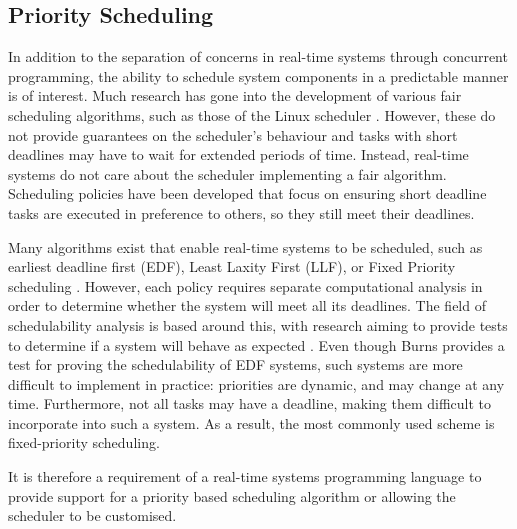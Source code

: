 \subsection{Priority Scheduling}
In addition to the separation of concerns in real-time systems through
concurrent programming, the ability to schedule system components in a
predictable manner is of interest.  Much research has gone into the development
of various fair scheduling algorithms, such as those of the Linux
scheduler \cite{6043273,7280991}. However, these do not provide guarantees on
the scheduler's behaviour and tasks with short deadlines may have to wait for
extended periods of time. Instead, real-time systems do not care about the
scheduler implementing a fair algorithm. Scheduling policies have been
developed that focus on ensuring short deadline tasks are executed in
preference to others, so they still meet their deadlines. 
\par\bigskip\noindent
Many algorithms exist that enable real-time systems to be
scheduled, such as earliest deadline first (EDF), Least Laxity First (LLF), or
Fixed Priority scheduling \cite{real-time-systems}.  However, each policy
requires separate computational analysis in order to determine whether the
system will meet all its deadlines.  The field of schedulability analysis is
based around this, with research aiming to provide tests to determine if a
system will behave as expected \cite{4815215,burns-sched-analysis}.  Even though 
Burns provides a test for proving the schedulability of EDF systems, such systems are
more difficult to implement in practice: priorities are dynamic, and may change
at any time. Furthermore, not all tasks may have a deadline, making them
difficult to incorporate into such a system.  As a result, the most commonly
used scheme is fixed-priority scheduling.  
\par\bigskip\noindent
It is
therefore a requirement of a real-time systems programming language to provide
support for a priority based scheduling algorithm or allowing the scheduler to
be customised. 

